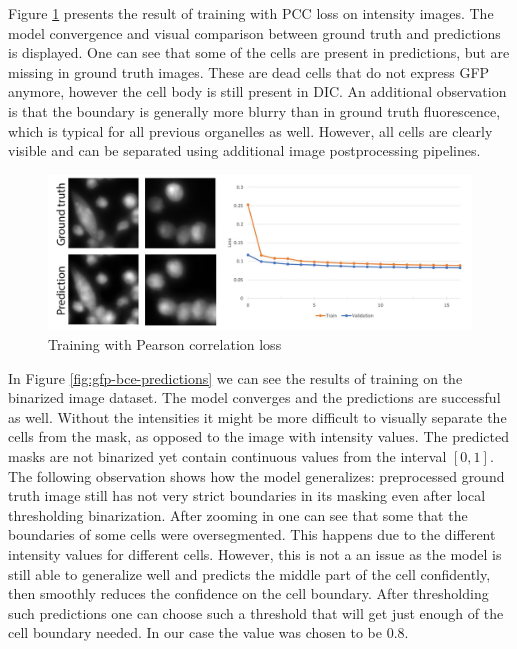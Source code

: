 Figure \ref{fig:gfp-pcc-predictions} presents the result of training with PCC loss on intensity images. The model convergence and visual comparison between ground truth and predictions is displayed. One can see that some of the cells are present in predictions, but are missing in ground truth images. These are dead cells that do not express GFP anymore, however the cell body is still present in DIC. An additional observation is that the boundary is generally more blurry than in ground truth fluorescence, which is typical for all previous organelles as well. However, all cells are clearly visible and can be separated using additional image postprocessing pipelines.
\begin{figure}[H]
	\begin{center}
		\includegraphics[width=0.6\linewidth]{bilder/gfp/predictions.png}
		\caption{Training with Pearson correlation loss}\label{fig:gfp-pcc-predictions}
	\end{center}
\end{figure}

In Figure \ref{fig:gfp-bce-predictions} we can see the results of training on the binarized image dataset. The model converges and the predictions are successful as well. Without the intensities it might be more difficult to visually separate the cells from the mask, as opposed to the image with intensity values. The predicted masks are not binarized yet contain continuous values from the interval $[0, 1]$. The following observation shows how the model generalizes: preprocessed ground truth image still has not very strict boundaries in its masking even after local thresholding binarization. After zooming in one can see that some that the boundaries of some cells were oversegmented. This happens due to the different intensity values for different cells. However, this is not a an issue as the model is still able to generalize well and predicts the middle part of the cell confidently, then smoothly reduces the confidence on the cell boundary. After thresholding such predictions one can choose such a threshold that will get just enough of the cell boundary needed. In our case the value was chosen to be $0.8$.

